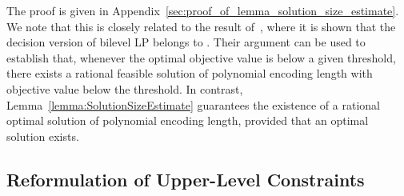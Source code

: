 \documentclass[runningheads,orivec]{llncs}
\newif\ifIPCOFlag
\newcommand{\IPCO}[2]{\ifIPCOFlag#1\else#2\fi}
\newcommand{\MacroColor}[1]{#1}
\newcommand{\ComplexityClassStyle}[1]{#1}
\newcommand{\ClassNP}{\MacroColor{\text{\ComplexityClassStyle{NP}}}}
\begin{document}
The proof is given in \IPCO{the full version of the paper~\cite{sugishita2025complexitybilevellinearprogramming}}{Appendix~\ref{sec:proof_of_lemma_solution_size_estimate}}.
\label{Rev:RelationToBuchheim}%
We note that this is closely related to the result of~\cite{Buchheim2023}, where it is shown that the decision version of bilevel LP belongs to \ClassNP{}.
Their argument can be used to establish that, whenever the optimal objective value is below a given threshold, there exists a rational feasible solution of polynomial encoding length with objective value below the threshold. 
In contrast, Lemma~\ref{lemma:SolutionSizeEstimate} guarantees the existence of a rational optimal solution of polynomial encoding length, provided that an optimal solution exists.

\subsection{Reformulation of Upper-Level Constraints}
\label{subsec:ReformulationOfCouplingConstraints}
\end{document}
